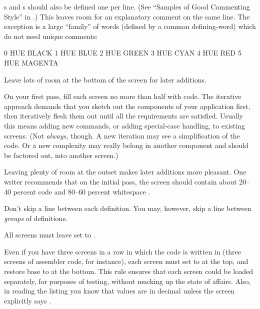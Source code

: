 s and s should also be defined one per
line.  (See ``Samples of Good Commenting Style'' in .) This
leaves room for an explanatory comment on the same line.  The
exception is a large ``family'' of words (defined by a common
defining-word) which do not need unique comments:
\begin{Code}
0 HUE BLACK     1 HUE BLUE      2 HUE GREEN
3 HUE CYAN      4 HUE RED       5 HUE MAGENTA
\end{Code}
\begin{tip}
Leave lots of room at the bottom of the screen for later additions.
\end{tip}
On your first pass, fill each screen no more than half with code.  The
iterative approach demands that you sketch out the components of your
application first, then iteratively flesh them out until all the
requirements are satisfied.  Usually this means adding new commands,
or adding special-case handling, to existing screens.  (Not
\emph{always,} though.  A new iteration may see a simplification of
the code. Or a new complexity may really belong in another component
and should be factored out, into another screen.)

Leaving plenty of room at the outset makes later additions more
pleasant.  One writer recommends that on the initial pass, the screen
should contain about 20--40 percent code and 80--60 percent
whitespace \cite{stevenson81}.

Don't skip a line between each definition.  You may, however, skip a
line between \emph{groups} of definitions.%
\begin{tip}
All screens must leave  set to .
\end{tip}
Even if you have three screens in a row in which the code is written
in  (three screens of assembler code, for instance), each
screen must set  to  at the top, and restore
base to  at the bottom.  This rule ensures that each
screen could be loaded separately, for purposes of testing, without
mucking up the state of affairs.  Also, in reading the listing you
know that values are in decimal unless the screen explicitly
says .

